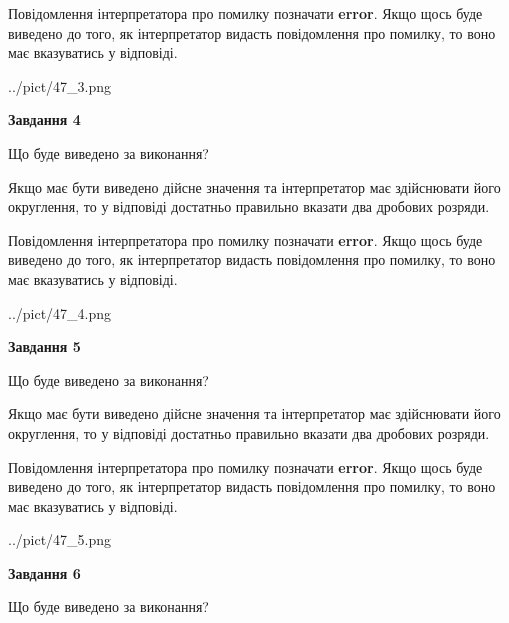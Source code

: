 \documentclass[12pt, ukrainian]{article}
\begin{document}
{\begin {Large}
Повідомлення інтерпретатора про помилку позначати \textbf{error}.
Якщо щось буде виведено до того, як інтерпретатор видасть повідомлення про помилку, 
то воно має вказуватись у відповіді. \par

\begin{center}
	{../pict/47_3.png}
\end{center}
\newpage

{\begin {center}\textbf{Завдання 4}\end {center}}\par
Що буде виведено за виконання? \par

Якщо має бути виведено дійсне значення та інтерпретатор має здійснювати його округлення, 
то у відповіді достатньо правильно вказати два дробових розряди.

Повідомлення інтерпретатора про помилку позначати \textbf{error}.
Якщо щось буде виведено до того, як інтерпретатор видасть повідомлення про помилку, 
то воно має вказуватись у відповіді. \par

\begin{center}
	{../pict/47_4.png}
\end{center}
\newpage

{\begin {center}\textbf{Завдання 5}\end {center}}\par
Що буде виведено за виконання? \par

Якщо має бути виведено дійсне значення та інтерпретатор має здійснювати його округлення, 
то у відповіді достатньо правильно вказати два дробових розряди.

Повідомлення інтерпретатора про помилку позначати \textbf{error}.
Якщо щось буде виведено до того, як інтерпретатор видасть повідомлення про помилку, 
то воно має вказуватись у відповіді. \par

\begin{center}
	{../pict/47_5.png}
\end{center}
\newpage

{\begin {center}\textbf{Завдання 6}\end {center}}\par
Що буде виведено за виконання? \par


\end{Large}}
\end{document}
